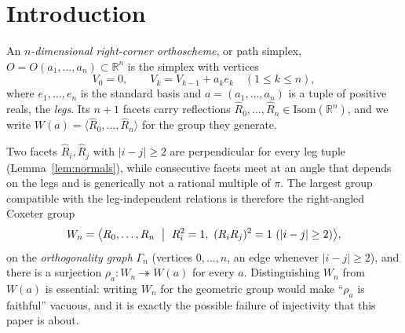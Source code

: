 \documentclass[11pt,a4paper]{article}
\newcommand{\R}{\mathbb{R}}
\newcommand{\Isom}{\mathrm{Isom}}
\theoremstyle{definition}
\theoremstyle{remark}
\theoremstyle{plain}
\begin{document}
\begin{abstract}
Whether $\rho_a$ is injective at all is decided here in dimension two only, where it is not.
That boundary is declared, not incidental. The planar proof is an amenability argument, and
Theorem~\ref{thm:barrier} shows that it cannot be run in any dimension $n\ge3$: $O(n)$ contains
a free subgroup of rank two for $n\ge3$, so $\Isom(\R^n)$ is not amenable as an abstract group,
and any argument of that shape would have to prove the strictly stronger statement that $W_n$
admits no embedding at all into $\Isom(\R^n)$. Section~\ref{sec:open} states the three problems
that remain, with what is known about each. We also record that nonvanishing of the
Schur-complement determinant $\det Q_n=-\prod_i a_i^2$ (Lemma~\ref{lem:uniform-detQ}) does not
imply faithfulness, contrary to an argument used in an earlier version of this material
(Remark~\ref{rem:detQ-nonsequitur}).
\end{abstract}

\section{Introduction}\label{sec:intro}

An \emph{$n$-dimensional right-corner orthoscheme}, or path simplex,
$O=O(a_1,\dots,a_n)\subset\R^n$ is the simplex with vertices
\[
V_0=0,\qquad V_k=V_{k-1}+a_k e_k\quad(1\le k\le n),
\]
where $e_1,\dots,e_n$ is the standard basis and $a=(a_1,\dots,a_n)$ is a tuple of positive
reals, the \emph{legs}. Its $n+1$ facets carry reflections
$\widehat R_0,\dots,\widehat R_n\in\Isom(\R^n)$, and we write
$W(a)=\langle\widehat R_0,\dots,\widehat R_n\rangle$ for the group they generate.

Two facets $\widehat R_i,\widehat R_j$ with $|i-j|\ge2$ are perpendicular for every leg tuple
(Lemma~\ref{lem:normals}), while consecutive facets meet at an angle that depends on the legs
and is generically not a rational multiple of $\pi$. The largest group compatible with the
leg-independent relations is therefore the right-angled Coxeter group
\begin{equation}\label{eq:Wn-presentation}
W_n=\bigl\langle R_0,\dots,R_n\ \bigm|\ R_i^2=1,\ (R_iR_j)^2=1\ (|i-j|\ge2)\bigr\rangle,
\end{equation}
on the \emph{orthogonality graph} $\Gamma_n$ (vertices $0,\dots,n$, an edge whenever
$|i-j|\ge2$), and there is a surjection $\rho_a\colon W_n\twoheadrightarrow W(a)$ for every
$a$. Distinguishing $W_n$ from $W(a)$ is essential: writing $W_n$ for the geometric group would
make ``$\rho_a$ is faithful'' vacuous, and it is exactly the possible failure of injectivity
that this paper is about.
\end{document}
